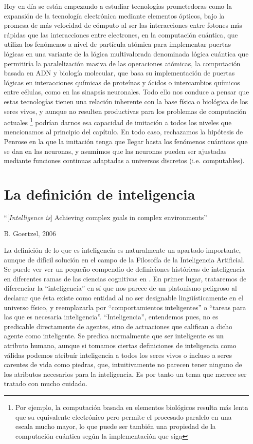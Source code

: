 \documentclass[12pt]{memoir}
\begin{document}
Hoy en día se están empezando a estudiar tecnologías prometedoras como la expansión de la tecnología electrónica mediante elementos ópticos, bajo la promesa de más velocidad de cómputo al ser las interacciones entre fotones más rápidas que las interacciones entre electrones, en la computación cuántica, que utiliza los fenómenos a nivel de partícula atómica para implementar puertas lógicas en una variante de la lógica multivalorada denominada lógica cuántica que permitiría la paralelización masiva de las operaciones atómicas, la computación basada en ADN y biología molecular, que basa su implementación de puertas lógicas en interacciones químicas de proteínas y ácidos o intercambios químicos entre células, como en las sinapsis neuronales. Todo ello nos conduce a pensar que estas tecnologías tienen una relación inherente con la base física o biológica de los seres vivos, y aunque no resulten productivas para los problemas de computación actuales \footnote{Por ejemplo, la computación basada en elementos biológicos resulta más lenta que su equivalente electrónico pero permite el procesado paralelo en una escala mucho mayor, lo que puede ser también una propiedad de la computación cuántica según la implementación que siga} podrían darnos esa capacidad de imitación a todos los niveles que mencionamos al principio del capítulo. En todo caso, rechazamos la hipótesis de Penrose en la que la imitación tenga que llegar hasta los fenómenos cuánticos que se dan en las neuronas, y asumimos que las neuronas pueden ser ajustadas mediante funciones continuas adaptadas a universos discretos (i.e. computables).

\chapter{La definición de inteligencia}

\epigraph{``[\textit{Intelligence is}] Achieving complex goals in complex environments''}{B. Goertzel, 2006}

La definición de lo que es inteligencia es naturalmente un apartado importante, aunque de difícil solución en el campo de la Filosofía de la Inteligencia Artificial. Se puede ver ver un pequeño compendio de definiciones históricas de inteligencia en diferentes ramas de las ciencias cognitivas en \cite{intDefs}. En primer lugar, trataremos de diferenciar la ``inteligencia'' en sí que nos parece de un platonismo peligroso al declarar que ésta existe como entidad al no ser designable lingüísticamente en el universo físico, y reemplazarla por ``comportamientos inteligentes'' o ``tareas para las que es necesaria inteligencia''. ``Inteligencia'', entendemos pues, no es predicable directamente de agentes, sino de actuaciones que califican a dicho agente como inteligente. Se predica normalmente que ser inteligente es un atributo humano, aunque si tomamos ciertas definiciones de inteligencia como válidas podemos atribuír inteligencia a todos los seres vivos o incluso a seres carentes de vida como piedras, que, intuitivamente no parecen tener ninguno de los atributos necesarios para la inteligencia. Es por tanto un tema que merece ser tratado con mucho cuidado.
\end{document}

